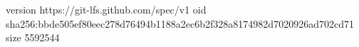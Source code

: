 version https://git-lfs.github.com/spec/v1
oid sha256:bbde505ef80eec278d76494b1188a2ec6b2f328a8174982d7020926ad702cd71
size 5592544
